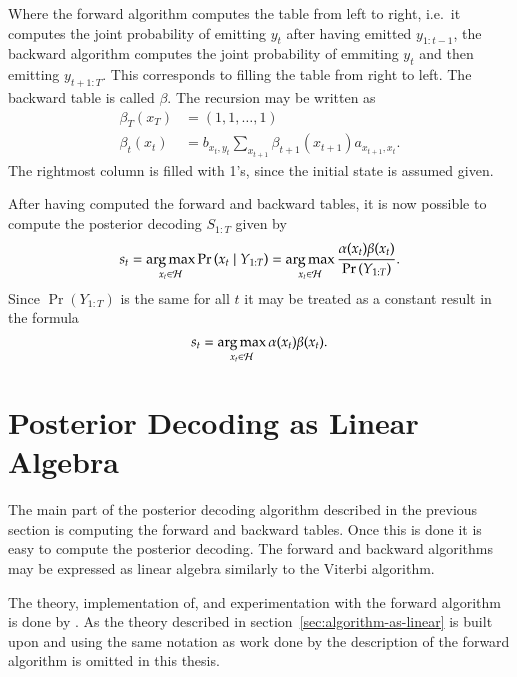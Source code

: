 Where the forward algorithm computes the table from left to right, i.e.\
it computes the joint probability of emitting $y_t$ after having emitted
$y_{1:t-1}$, the backward algorithm computes the joint probability of emmiting
$y_t$ and then emitting $y_{t+1:T}$. This corresponds to filling the table from
right to left. The backward table is called $\beta$. The recursion may be written as
\begin{equation}
  \label{eq:9}
  \begin{aligned}
    \beta_T(x_T) &= (1, 1, \dots, 1) \\
    \beta_t(x_t) &= b_{x_t, y_t} \sum_{x_{t + 1}} \beta_{t + 1}(x_{t + 1})
    a_{x_{t + 1}, x_t}.
  \end{aligned}
\end{equation}
The rightmost column is filled with 1's, since the initial state is assumed
given.

After having computed the forward and backward tables, it is now possible to
compute the posterior decoding $S_{1:T}$ given by
\begin{equation*}
  s_t = \operatorname*{arg\,max}_{x_t \in \mathcal{H}} \Pr \left(x_t \mid Y_{1:T} \right) =
  \operatorname*{arg\,max}_{x_t \in \mathcal{H}} \frac{\alpha(x_t) \beta(x_t)}{\Pr \left( Y_{1:T} \right)}.
\end{equation*}
Since $\Pr \left( Y_{1:T} \right)$ is the same for all $t$ it may be treated as
a constant result in the formula
\begin{equation}
  \label{eq:6}
  s_t = \operatorname*{arg\,max}_{x_t \in \mathcal{H}} \alpha(x_t) \beta(x_t).
\end{equation}

\section{Posterior Decoding as Linear Algebra}

The main part of the posterior decoding algorithm described in the previous
section is computing the forward and backward tables. Once this is done it is
easy to compute the posterior decoding. The forward and backward algorithms may
be expressed as linear algebra similarly to the Viterbi algorithm.

The theory, implementation of, and experimentation with the forward algorithm
is done by \citet{sand2013ziphmmlib}. As the theory described in
section~\ref{sec:algorithm-as-linear} is built upon and using the same notation
as work done by \citet{sand2013ziphmmlib} the description of the forward
algorithm is omitted in this thesis.

